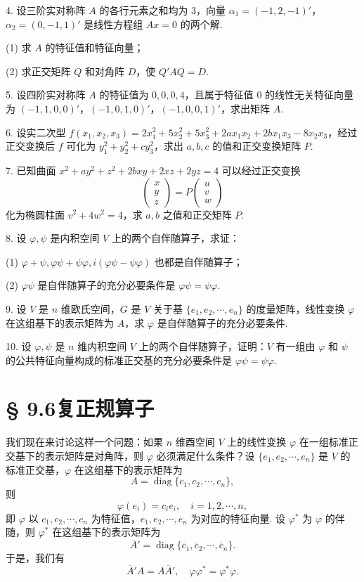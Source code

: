 \documentclass[UTF8, 12pt, fontset=fandol, oneside]{ctexart}
\begin{document}
4. 设三阶实对称阵 $A$ 的各行元素之和均为 $3$，向量 $\alpha_1=(-1,2,-1)'$，$\alpha_2=(0,-1,1)'$ 是线性方程组 $Ax=0$ 的两个解.

(1) 求 $A$ 的特征值和特征向量；

(2) 求正交矩阵 $Q$ 和对角阵 $D$，使 $Q'AQ=D$.

5. 设四阶实对称阵 $A$ 的特征值为 $0,0,0,4$，且属于特征值 $0$ 的线性无关特征向量为 $(-1,1,0,0)'$，$(-1,0,1,0)'$，$(-1,0,0,1)'$，求出矩阵 $A$.

6. 设实二次型 $f(x_1,x_2,x_3)=2x_1^2+5x_2^2+5x_3^2+2ax_1x_2+2bx_1x_3-8x_2x_3$，经过正交变换后 $f$ 可化为 $y_1^2+y_2^2+cy_3^2$，求出 $a,b,c$ 的值和正交变换矩阵 $P$.

7. 已知曲面 $x^2+ay^2+z^2+2bxy+2xz+2yz=4$ 可以经过正交变换
\[
  \left(\begin{array}{c}
    x\\ y\\ z
  \end{array}\right)
  =P
  \left(\begin{array}{c}
    u\\ v\\ w
  \end{array}\right)
\]
化为椭圆柱面 $v^2+4w^2=4$，求 $a,b$ 之值和正交矩阵 $P$.

8. 设 $\varphi,\psi$ 是内积空间 $V$ 上的两个自伴随算子，求证：

(1) $\varphi+\psi,\varphi\psi+\psi\varphi,i(\varphi\psi-\psi\varphi)$ 也都是自伴随算子；

(2) $\varphi\psi$ 是自伴随算子的充分必要条件是 $\varphi\psi=\psi\varphi$.

9. 设 $V$ 是 $n$ 维欧氏空间，$G$ 是 $V$ 关于基 $\{e_1,e_2,\cdots,e_n\}$ 的度量矩阵，线性变换 $\varphi$ 在这组基下的表示矩阵为 $A$，求 $\varphi$ 是自伴随算子的充分必要条件.

10. 设 $\varphi,\psi$ 是 $n$ 维内积空间 $V$ 上的两个自伴随算子，证明：$V$ 有一组由 $\varphi$ 和 $\psi$ 的公共特征向量构成的标准正交基的充分必要条件是 $\varphi\psi=\psi\varphi$.

\section*{§ 9.6\quad 复正规算子}

我们现在来讨论这样一个问题：如果 $n$ 维酉空间 $V$ 上的线性变换 $\varphi$ 在一组标准正交基下的表示矩阵是对角阵，则 $\varphi$ 必须满足什么条件？设 $\{e_1,e_2,\cdots,e_n\}$ 是 $V$ 的标准正交基，$\varphi$ 在这组基下的表示矩阵为
\[
  A=\operatorname{diag}\{c_1,c_2,\cdots,c_n\},
\]
则
\[
  \varphi(e_i)=c_ie_i,\quad i=1,2,\cdots,n,
\]
即 $\varphi$ 以 $c_1,c_2,\cdots,c_n$ 为特征值，$e_1,e_2,\cdots,e_n$ 为对应的特征向量. 设 $\varphi^*$ 为 $\varphi$ 的伴随，则 $\varphi^*$ 在这组基下的表示矩阵为
\[
  \overline A'=\operatorname{diag}\{\overline c_1,\overline c_2,\cdots,\overline c_n\}.
\]
于是，我们有
\[
  \overline A'A=A\overline A',\quad \varphi\varphi^*=\varphi^*\varphi.
\]
\end{document}
